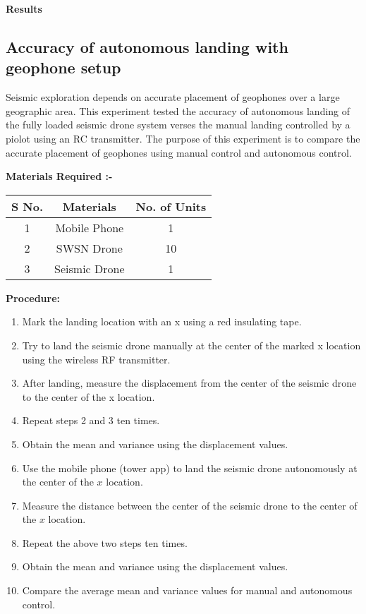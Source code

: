 \textbf{Results}



\subsection{Accuracy of autonomous landing with geophone setup}
Seismic exploration depends on accurate placement of geophones over a large geographic area.  This experiment tested the accuracy of autonomous landing of the fully loaded seismic drone system verses the manual landing controlled by a piolot using an RC transmitter. The purpose of this experiment is to compare the accurate placement of geophones using manual control and autonomous control.

\textbf{Materials Required :-}
\begin{center}
 \begin{tabular}{||c c c||} 
 \hline
 S No. & Materials & No. of Units \\ [0.5ex] 
 \hline\hline
1 &	Mobile Phone &	1 \\ 
 \hline
2 & SWSN Drone &	10 \\
 \hline
3 &	Seismic Drone &	1 \\ [1ex] 
 \hline
\end{tabular}
\end{center}


\textbf{Procedure:}
\begin{enumerate}
\item Mark the landing location with an x using a red insulating tape.
\item Try to land the seismic drone manually at the center of the marked x location using the wireless RF transmitter.
\item After landing, measure the displacement from the center of the seismic drone to the center of the x location.
\item Repeat steps 2 and 3 ten times.
\item Obtain the mean and variance using the displacement values.
\item Use the mobile phone (tower app) to land the seismic drone autonomously at the center of the $x$ location.
\item Measure the distance between the center of the seismic drone to the center of the $x$ location.
\item Repeat the above two steps ten times.
\item Obtain the mean and variance using the displacement values.
\item Compare the average mean and variance values for manual and autonomous control.
\end{enumerate}

